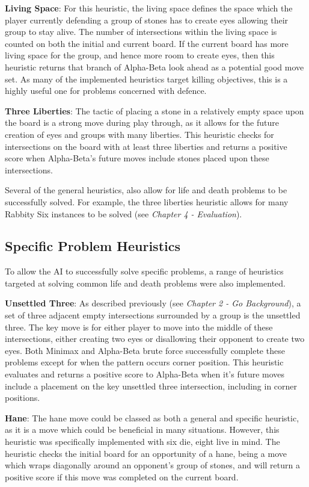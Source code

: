 \documentclass{l3proj}
\begin{document}
\textbf{Living Space}: For this heuristic, the living space defines the space which the player currently defending a group of stones has to create eyes allowing their group to stay alive. The number of intersections within the living space is counted on both the initial and current board. If the current board has more living space for the group, and hence more room to create eyes, then this heuristic returns that branch of Alpha-Beta look ahead as a potential good move set. As many of the implemented heuristics target killing objectives, this is a highly useful one for problems concerned with defence.

\textbf{Three Liberties}: The tactic of placing a stone in a relatively empty space upon the board is a strong move during play through, as it allows for the future creation of eyes and groups with many liberties. This heuristic checks for intersections on the board with at least three liberties and returns a positive score when Alpha-Beta's future moves include stones placed upon these intersections.

Several of the general heuristics, also allow for life and death problems to be successfully solved. For example, the three liberties heuristic allows for many Rabbity Six instances to be solved (see \textit{Chapter 4 - Evaluation}).

\subsection{Specific Problem Heuristics}

To allow the AI to successfully solve specific problems, a range of heuristics targeted at solving common life and death problems were also implemented.

\textbf{Unsettled Three}: As described previously (see \textit{Chapter 2 - Go Background}), a set of three adjacent empty intersections surrounded by a group is the unsettled three. The key move is for either player to move into the middle of these intersections, either creating two eyes or disallowing their opponent to create two eyes. Both Minimax and Alpha-Beta brute force successfully complete these problems except for when the pattern occurs corner position. This heuristic evaluates and returns a positive score to Alpha-Beta when it's future moves include a placement on the key unsettled three intersection, including in corner positions.

\textbf{Hane}: The hane move could be classed as both a general and specific heuristic, as it is a move which could be beneficial in many situations. However, this heuristic was specifically implemented with six die, eight live in mind. The heuristic checks the initial board for an opportunity of a hane, being a move which wraps diagonally around an opponent's group of stones, and will return a positive score if this move was completed on the current board.
\end{document}
